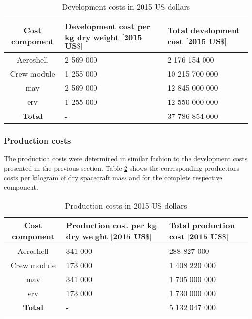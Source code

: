 \begin{table}[h]
	\centering
	\caption{Development costs in 2015 US dollars}
	\begin{tabular}{|c|p{5cm}|p{5cm}|}
		\hline
		\textbf{Cost component} & \textbf{Development cost per kg dry weight $\mathbf{[2015}$ $\mathbf{US\$]}$} & \textbf{Total development cost $\mathbf{[2015}$ $\mathbf{US\$]}$} \\ \hline \hline
		Aeroshell & 2 569 000 & 2 176 154 000 \\
		Crew module & 1 255 000 & 10 215 700 000 \\
		\acrlong{mav} & 2 569 000 & 12 845 000 000 \\
		\acrlong{erv} & 1 255 000 & 12 550 000 000 \\ \hline
		\textbf{Total} & - & 37 786 854 000 \\
		\hline
	\end{tabular}
	\label{tab:devcosts}
\end{table}

\subsubsection{Production costs}
The production costs were determined in similar fashion to the development costs presented in the previous section. Table \ref{tab:productioncosts} shows the corresponding productions costs per kilogram of dry spacecraft mass and for the complete respective component.
\begin{table}[h]
	\centering
	\caption{Production costs in 2015 US dollars}
	\begin{tabular}{|c|p{5cm}|p{5cm}|}
		\hline
		\textbf{Cost component} & \textbf{Production cost per kg dry weight $\mathbf{[2015}$ $\mathbf{US\$]}$} & \textbf{Total production cost $\mathbf{[2015}$ $\mathbf{US\$]}$} \\
		\hline \hline
		Aeroshell & 341 000 & 288 827 000 \\
		Crew module & 173 000 & 1 408 220 000 \\ 
		\acrlong{mav} & 341 000 & 1 705 000 000 \\
		\acrlong{erv} & 173 000 & 1 730 000 000 \\ \hline
		\textbf{Total} & - & 5 132 047 000 \\
		\hline
	\end{tabular}
	\label{tab:productioncosts}
\end{table}

